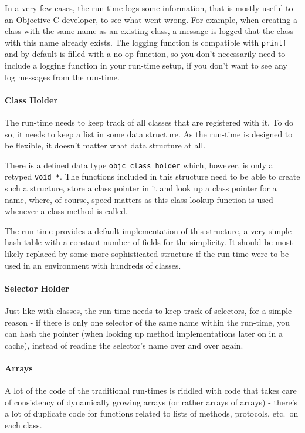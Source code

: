 In a very few cases, the run-time logs some information, that is mostly useful to an Objective-C developer, to see what went wrong. For example, when creating a class with the same name as an existing class, a message is logged that the class with this name already exists. The logging function is compatible with \verb=printf= and by default is filled with a no-op function, so you don't necessarily need to include a logging function in your run-time setup, if you don't want to see any log messages from the run-time.

\paragraph{Class Holder}

The run-time needs to keep track of all classes that are registered with it. To do so, it needs to keep a list in some data structure. As the run-time is designed to be flexible, it doesn't matter what data structure at all.

There is a defined data type \verb=objc_class_holder= which, however, is only a retyped \verb=void *=. The functions included in this structure need to be able to create such a structure, store a class pointer in it and look up a class pointer for a name, where, of course, speed matters as this class lookup function is used whenever a class method is called.

The run-time provides a default implementation of this structure, a very simple hash table with a constant number of fields for the simplicity. It should be most likely replaced by some more sophisticated structure if the run-time were to be used in an environment with hundreds of classes.

\paragraph{Selector Holder}

Just like with classes, the run-time needs to keep track of selectors, for a simple reason - if there is only one selector of the same name within the run-time, you can hash the pointer (when looking up method implementations later on in a cache), instead of reading the selector's name over and over again.

\paragraph{Arrays}

A lot of the code of the traditional run-times is riddled with code that takes care of consistency of dynamically growing arrays (or rather arrays of arrays) - there's a lot of duplicate code for functions related to lists of methods, protocols, etc.\ on each class.

